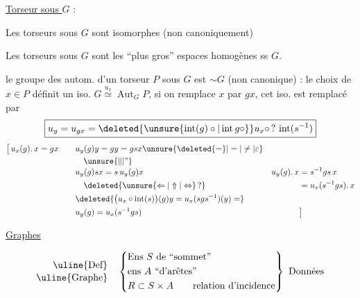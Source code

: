 \uline{Torseur sous $G$} :
{\small
{}}


Les torseurs sous $G$ sont isomorphes (non canoniquement)

Les torseurs sous $G$ sont les ``plus gros'' espaces homogènes ss $G$.

le groupe des autom. d'un torseur $P$ sous $G$ est $\sim G$ (non canonique) : le choix de $x\in P$ définit un iso. $G\overset{u_x}{\simeq}\operatorname{Aut}_{G}P$, si on remplace $x$ par $gx$, cet iso. est remplacé par
\[
\boxed{u_y=u_{gx}=\deleted{\unsure{\operatorname{int}(g)\circ|\operatorname{int}g\circ}}u_x\circ\,?\,\operatorname{int}(s^{-1})}
\]
{\small
\[
\begin{aligned}
\bigl[\,u_x(g).\,x=gx\qquad &u_y(g)y=gy=gsx\unsure{\deleted{=}|=|\ne|\varepsilon} &&\\
&\quad\unsure{\Vert|\text{''}} &&\\[-3pt]
&u_y(g)sx=s\,u_y(g)x\qquad &u_y(g).\,x&=s^{-1}gs\,x\\
&\quad\deleted{\unsure{\Leftarrow|\Uparrow|\Leftrightarrow}\,?} &&=u_x(s^{-1}gs).\,x\\
&\deleted{\bigl(u_x\circ\operatorname{int}(s)\bigr)(g)y=u_x(sgs^{-1})(y)=} &&\\
&u_y(g)=u_x(s^{-1}gs) &&\bigr]
\end{aligned}
\]}


\uline{Graphes}

\[
\begin{aligned}
\text{\uline{Def}}\\[-2pt]\text{\uline{Graphe}}
\end{aligned}
\quad
\left\{\begin{aligned}
&\text{Ens } S\ \text{de ``sommet''}\\
&\text{ens } A\ \text{``d'arêtes''}\\
&R\subset S\times A\qquad\text{relation d'incidence}
\end{aligned}\right\}
\ \text{Données}
\]

